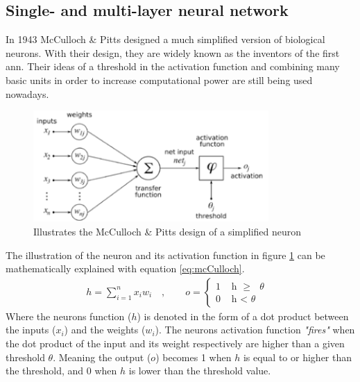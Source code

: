 \documentclass[USenglish]{ifimaster}  %
\begin{document}
\subsection{Single- and multi-layer neural network}
In 1943 McCulloch \& Pitts designed a much simplified version of biological neurons\cite{mcculloch_pitts}. With their design, they are widely known as the inventors of the first \ac{ann}. Their ideas of a threshold in the activation function and combining many basic units in order to increase computational power are still being used nowadays.
\begin{figure}[ht]
    \centering
    \includegraphics[width=0.8\textwidth]{bilder/mcculloch_and_pitts.png}
    \caption{Illustrates the McCulloch \& Pitts design of a simplified neuron \cite{website:mcCulloch_img}}
    \label{fig:mcculoch_and_pitts}
\end{figure}
The illustration of the neuron and its activation function in figure \cref{fig:mcculoch_and_pitts} can be mathematically explained with equation \cref{eq:mcCulloch}.
\begin{equation}\label{eq:mcCulloch}
\begin{aligned}
    {h = \sum_{i=1}^{n} x_i w_i \quad , \quad\quad o =
\begin{cases}
    1 & \text{ h $\geq$ $\theta$ }  \\
    0 & \text{ h < $\theta$ }
\end{cases}}
\end{aligned}
\end{equation}
Where the neurons function ($h$) is denoted in the form of a dot product between the inputs ($x_i$) and the weights ($w_i$). The neurons activation function \textit{"fires"} when the dot product of the input and its weight respectively are higher than a given threshold $\theta$. Meaning the output ($o$) becomes 1 when $h$ is equal to or higher than the threshold, and 0 when $h$ is lower than the threshold value.
\newline
\newline
\end{document}
